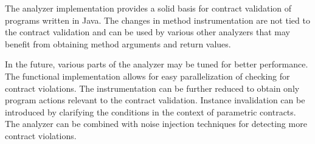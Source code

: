 The analyzer implementation provides a solid basis for contract validation of
programs written in Java. The changes in method instrumentation are not tied to
the contract validation and can be used by various other analyzers that may
benefit from obtaining method arguments and return values.

In the future, various parts of the analyzer may be tuned for better
performance. The functional implementation allows for easy parallelization of
checking for contract violations. The instrumentation can be further reduced to
obtain only program actions relevant to the contract validation. Instance
invalidation can be introduced by clarifying the conditions in the context of
parametric contracts. The analyzer can be combined with noise injection
techniques for detecting more contract violations.

